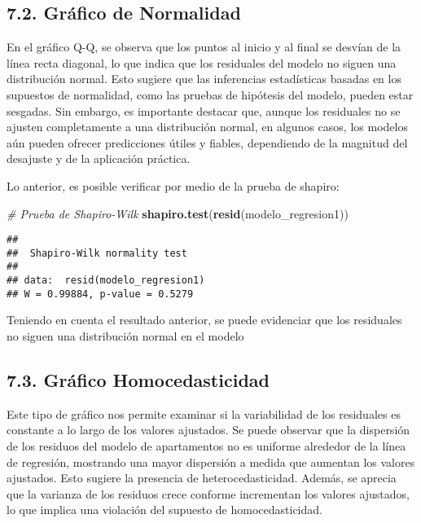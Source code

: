 \documentclass[
]{article}
\newenvironment{Shaded}{\begin{snugshade}}{\end{snugshade}}
\newcommand{\CommentTok}[1]{\textcolor[rgb]{0.56,0.35,0.01}{\textit{#1}}}
\newcommand{\FunctionTok}[1]{\textcolor[rgb]{0.13,0.29,0.53}{\textbf{#1}}}
\newcommand{\NormalTok}[1]{#1}
\begin{document}
\subsection{\texorpdfstring{\textbf{7.2. Gráfico de
Normalidad}}{7.2. Gráfico de Normalidad}}\label{gruxe1fico-de-normalidad}

En el gráfico Q-Q, se observa que los puntos al inicio y al final se
desvían de la línea recta diagonal, lo que indica que los residuales del
modelo no siguen una distribución normal. Esto sugiere que las
inferencias estadísticas basadas en los supuestos de normalidad, como
las pruebas de hipótesis del modelo, pueden estar sesgadas. Sin embargo,
es importante destacar que, aunque los residuales no se ajusten
completamente a una distribución normal, en algunos casos, los modelos
aún pueden ofrecer predicciones útiles y fiables, dependiendo de la
magnitud del desajuste y de la aplicación práctica.

Lo anterior, es posible verificar por medio de la prueba de shapiro:

\begin{Shaded}
\begin{Highlighting}[]
\CommentTok{\# Prueba de Shapiro{-}Wilk}
\FunctionTok{shapiro.test}\NormalTok{(}\FunctionTok{resid}\NormalTok{(modelo\_regresion1))}
\end{Highlighting}
\end{Shaded}

\begin{verbatim}
## 
##  Shapiro-Wilk normality test
## 
## data:  resid(modelo_regresion1)
## W = 0.99884, p-value = 0.5279
\end{verbatim}

Teniendo en cuenta el resultado anterior, se puede evidenciar que los
residuales no siguen una distribución normal en el modelo

\subsection{\texorpdfstring{\textbf{7.3. Gráfico
Homocedasticidad}}{7.3. Gráfico Homocedasticidad}}\label{gruxe1fico-homocedasticidad}

Este tipo de gráfico nos permite examinar si la variabilidad de los
residuales es constante a lo largo de los valores ajustados. Se puede
observar que la dispersión de los residuos del modelo de apartamentos no
es uniforme alrededor de la línea de regresión, mostrando una mayor
dispersión a medida que aumentan los valores ajustados. Esto sugiere la
presencia de heterocedasticidad. Además, se aprecia que la varianza de
los residuos crece conforme incrementan los valores ajustados, lo que
implica una violación del supuesto de homocedasticidad.
\end{document}
